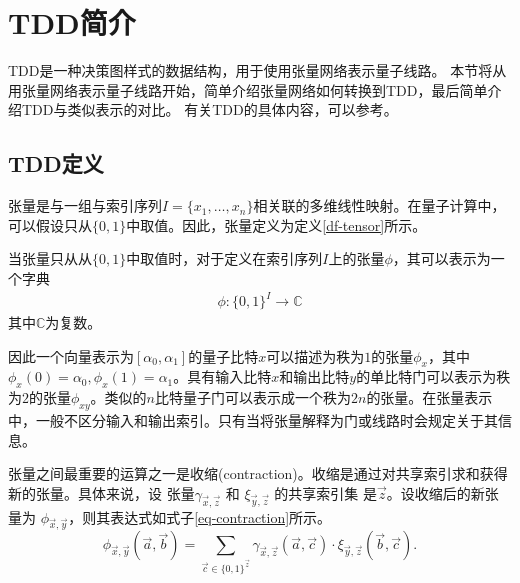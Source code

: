 \section{TDD简介}
TDD是一种决策图样式的数据结构，用于使用张量网络表示量子线路。
本节将从用张量网络表示量子线路开始，简单介绍张量网络如何转换到TDD，最后简单介绍TDD与类似表示的对比。
有关TDD的具体内容，可以参考\citep{Hong_2022}。
\subsection{TDD定义}
张量是与一组与索引序列\(I=\{x_1,\ldots,x_n\}\)相关联的多维线性映射。在量子计算中，可以假设只从\(\{0,1\}\)中取值。因此，张量定义为定义\ref{df-tensor}所示。
\begin{definition}\citep{biamonte2019lectures}
    \label{df-tensor}
    当张量只从从\(\{0,1\}\)中取值时，对于定义在索引序列\(I\)上的张量\(\phi\)，其可以表示为一个字典
    \begin{align}
        \phi :{\{0,1\}}^I\rightarrow\mathbb{C}
    \end{align}
    其中\(\mathbb{C}\)为复数。
\end{definition}


因此一个向量表示为$[\alpha_0,\alpha_1]$的量子比特$x$可以描述为秩为$1$的张量$\phi_x$，其中$\phi_x\left(0\right)=\alpha_0, \phi_x\left(1\right)=\alpha_1$。具有输入比特$x$和输出比特$y$的单比特门可以表示为秩为$2$的张量$\phi_{xy}$。类似的$n$比特量子门可以表示成一个秩为$2n$的张量。在张量表示中，一般不区分输入和输出索引。只有当将张量解释为门或线路时会规定关于其信息。

张量之间最重要的运算之一是收缩(contraction)。收缩是通过对共享索引求和获得新的张量。具体来说，设 张量$\gamma_{\overrightarrow{x},\overrightarrow{z}}$ 和 $\xi_{\overrightarrow{y},\overrightarrow{z}}$ 的共享索引集 是$\overrightarrow{z}$。设收缩后的新张量为 $\phi_{\overrightarrow{x},\overrightarrow{y}}$，则其表达式如式子\ref{eq-contraction}所示。
\begin{equation}
\label{eq-contraction}
\phi_{\overrightarrow{x},\overrightarrow{y}}(\overrightarrow{a},\overrightarrow{b}) = \sum_{\overrightarrow{c} \in \{0,1\}^{\overrightarrow{z}}} \gamma_{\overrightarrow{x},\overrightarrow{z}}(\overrightarrow{a}, \overrightarrow{c}) \cdot \xi_{\overrightarrow{y},\overrightarrow{z}}(\overrightarrow{b}, \overrightarrow{c}).
\end{equation}

